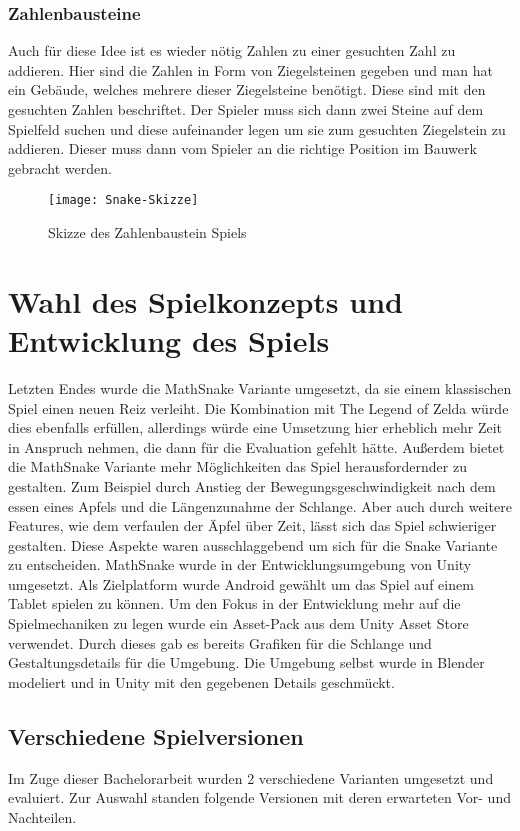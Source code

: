 \subsubsection{Zahlenbausteine}
Auch für diese Idee ist es wieder nötig Zahlen zu einer gesuchten Zahl zu addieren. Hier sind die Zahlen in Form von Ziegelsteinen gegeben und man hat ein Gebäude, welches mehrere dieser Ziegelsteine benötigt. Diese sind mit den gesuchten Zahlen beschriftet. Der Spieler muss sich dann zwei Steine auf dem Spielfeld suchen und diese aufeinander legen um sie zum gesuchten Ziegelstein zu addieren. Dieser muss dann vom Spieler an die richtige Position im Bauwerk gebracht werden.
\begin{figure}[htb]
	\centering
	\texttt{[image: Snake-Skizze]}
	\caption{Skizze des Zahlenbaustein Spiels\label{fig:baustein}}
\end{figure}
\section{Wahl des Spielkonzepts und Entwicklung des Spiels}
Letzten Endes wurde die MathSnake Variante umgesetzt, da sie einem klassischen Spiel einen neuen Reiz verleiht. Die Kombination mit The Legend of Zelda würde dies ebenfalls erfüllen, allerdings würde eine Umsetzung hier erheblich mehr Zeit in Anspruch nehmen, die dann für die Evaluation gefehlt hätte. Außerdem bietet die MathSnake Variante mehr Möglichkeiten das Spiel herausfordernder zu gestalten. Zum Beispiel durch Anstieg der Bewegungsgeschwindigkeit nach dem essen eines Apfels und die Längenzunahme der Schlange. Aber auch durch weitere Features, wie dem verfaulen der Äpfel über Zeit, lässt sich das Spiel schwieriger gestalten. Diese Aspekte waren ausschlaggebend um sich für die Snake Variante zu entscheiden.
MathSnake wurde in der Entwicklungsumgebung von Unity umgesetzt. Als Zielplatform wurde Android gewählt um das Spiel auf einem Tablet spielen zu können. Um den Fokus in der Entwicklung mehr auf die Spielmechaniken zu legen wurde ein Asset-Pack aus dem Unity Asset Store verwendet. Durch dieses gab es bereits Grafiken für die Schlange und Gestaltungsdetails für die Umgebung. Die Umgebung selbst wurde in Blender modeliert und in Unity mit den gegebenen Details geschmückt.
\subsection{Verschiedene Spielversionen}
Im Zuge dieser Bachelorarbeit wurden 2 verschiedene Varianten umgesetzt und evaluiert. Zur Auswahl standen folgende Versionen mit deren erwarteten Vor- und Nachteilen.

